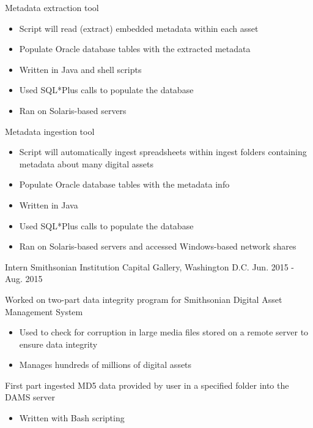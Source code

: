 \begin{cventries}
{\begin{cvitems}
        \item{Metadata extraction tool}
        \begin{itemize}
            \item{Script will read (extract) embedded metadata within each asset}
            \item{Populate Oracle database tables with the extracted metadata}
            \item{Written in Java and shell scripts}
			\item{Used SQL*Plus calls to populate the database}
			\item{Ran on Solaris-based servers}
        \end{itemize}
        \item{Metadata ingestion tool}
        \begin{itemize}
            \item{Script will automatically ingest spreadsheets within ingest folders containing metadata about many digital assets}
            \item{Populate Oracle database tables with the metadata info}
            \item{Written in Java}
			\item{Used SQL*Plus calls to populate the database}
			\item{Ran on Solaris-based servers and accessed Windows-based network shares}
        \end{itemize}
        \end{cvitems}
    }
    \cventry
    {Intern}
    {Smithsonian Institution}
    {Capital Gallery, Washington D.C.}
    {Jun. 2015 - Aug. 2015}
    {
      \begin{cvitems}
        \item {Worked on two-part data integrity program for Smithsonian Digital Asset Management System}
        \begin{itemize}
            \item{Used to check for corruption in large media files stored on a remote server to ensure data integrity}
            \item{Manages hundreds of millions of digital assets}
        \end{itemize}
        \item {First part ingested MD5 data provided by user in a specified folder into the DAMS server}
        \begin{itemize}
            \item{Written with Bash scripting}
        \end{itemize}

\end{cvitems}}
\end{cventries}
